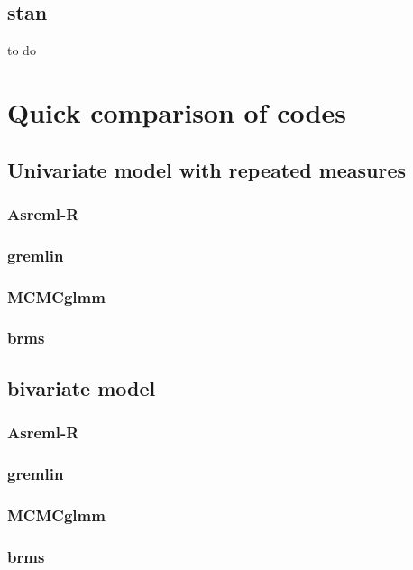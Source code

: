 \documentclass[
  12pt,
]{book}
\begin{document}
\hypertarget{stan-2}{%
\section{stan}\label{stan-2}}

to do

\hypertarget{quick-comparison-of-codes}{%
\chapter{Quick comparison of codes}\label{quick-comparison-of-codes}}

\hypertarget{univariate-model-with-repeated-measures}{%
\section{Univariate model with repeated measures}\label{univariate-model-with-repeated-measures}}

\hypertarget{asreml-r-3}{%
\subsection{Asreml-R}\label{asreml-r-3}}

\hypertarget{gremlin-4}{%
\subsection{gremlin}\label{gremlin-4}}

\hypertarget{mcmcglmm-4}{%
\subsection{MCMCglmm}\label{mcmcglmm-4}}

\hypertarget{brms-4}{%
\subsection{brms}\label{brms-4}}

\hypertarget{bivariate-model}{%
\section{bivariate model}\label{bivariate-model}}

\hypertarget{asreml-r-4}{%
\subsection{Asreml-R}\label{asreml-r-4}}

\hypertarget{gremlin-5}{%
\subsection{gremlin}\label{gremlin-5}}

\hypertarget{mcmcglmm-5}{%
\subsection{MCMCglmm}\label{mcmcglmm-5}}

\hypertarget{brms-5}{%
\subsection{brms}\label{brms-5}}

  

\printindex
\end{document}
